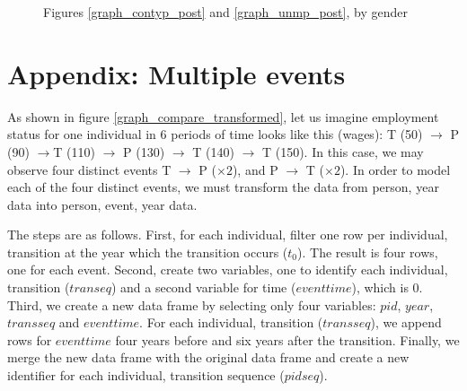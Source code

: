 \documentclass[12pt]{article}
\begin{document}
\begin{figure}
    \caption{Figures \ref{graph_contyp_post} and \ref{graph_unmp_post}, by gender}
    \label{graph_post_event_gender}
\end{figure}

\clearpage
\section{Appendix: Multiple events}\label{sec:multiple}
\setcounter{figure}{0}    
\setcounter{table}{0}    
\renewcommand*\thetable{\Alph{section}.\arabic{table}}
\renewcommand*\thefigure{\Alph{section}.\arabic{figure}}
\renewcommand{\theHfigure}{\Alph{section}.\arabic{table}}
\renewcommand{\theHtable}{\Alph{section}.\arabic{figure}}

As shown in figure \ref{graph_compare_transformed}, let us imagine employment status for one individual in 6 periods of time looks like this (wages): T (50) $\rightarrow$ P (90) $\rightarrow$T (110) $\rightarrow$ P (130) $\rightarrow$ T (140) $\rightarrow$ T (150).  In this case, we may observe four distinct events T $\rightarrow$ P ($\times 2$), and P $\rightarrow$ T ($\times 2$).  In order to model each of the four distinct events, we must transform the data from person, year data into person, event, year data.

The steps are as follows.  First, for each individual, filter one row per individual, transition at the year which the transition occurs ($t_0$).  The result is four rows, one for each event.  Second, create two variables, one to identify each individual, transition ($transeq$) and a second variable for time ($eventtime$), which is 0.  Third, we create a new data frame by selecting only four variables: $pid$, $year$, $transseq$ and $eventtime$.  For each individual, transition ($transseq$), we append rows for $eventtime$ four years before and six years after the transition.  Finally, we merge the new data frame with the original data frame and create a new identifier for each individual, transition sequence ($pidseq$).   
\end{document}
